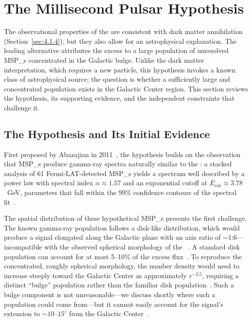 
\section{The Millisecond Pulsar Hypothesis}
\label{sec:4.2}

The observational properties of the \GCE are consistent with dark matter annihilation (Section~\ref{sec:4.1.4}), but they also allow for an astrophysical explanation.
The leading alternative attributes the excess to a large population of unresolved \glspl{MSP_} concentrated in the Galactic bulge.
Unlike the dark matter interpretation, which requires a new particle, this hypothesis invokes a known class of astrophysical source; the question is whether a sufficiently large and concentrated population exists in the Galactic Center region.
This section reviews the \MSP hypothesis, its supporting evidence, and the independent constraints that challenge it.

\subsection{The Hypothesis and Its Initial Evidence}
\label{sec:4.2.1}

First proposed by Abazajian in 2011~\cite{Abazajian:2010zy}, the \MSP hypothesis builds on the observation that \glspl{MSP_} produce gamma-ray spectra naturally similar to the \GCE: a stacked analysis of 61 Fermi-LAT-detected \glspl{MSP_} yields a spectrum well described by a power law with spectral index $\alpha \approx 1.57$ and an exponential cutoff at $E_{\mathrm{cut}} \approx 3.78$~GeV, parameters that fall within the 99\% confidence contours of the \GCE spectral fit~\cite{Calore:2014xka}.

The spatial distribution of these hypothetical \glspl{MSP_} presents the first challenge.
The known gamma-ray \MSP population follows a disk-like distribution, which would produce a signal elongated along the Galactic plane with an axis ratio of $\sim 1$:$6$---incompatible with the observed spherical morphology of the \GCE~\cite{Daylan:2014rsa}.
A standard disk \MSP population can account for at most 5--10\% of the excess flux~\cite{Calore:2014xka}.
To reproduce the concentrated, roughly spherical \GCE morphology, the \MSP number density would need to increase steeply toward the Galactic Center as approximately $r^{-2.5}$, requiring a distinct ``bulge'' population rather than the familiar disk population~\cite{Calore:2014xka}.
Such a bulge component is not unreasonable---we discuss shortly where such a population could come from---but it cannot easily account for the signal's extension to $\sim 10$--$15^\circ$ from the Galactic Center~\cite{Calore:2014xka}.

